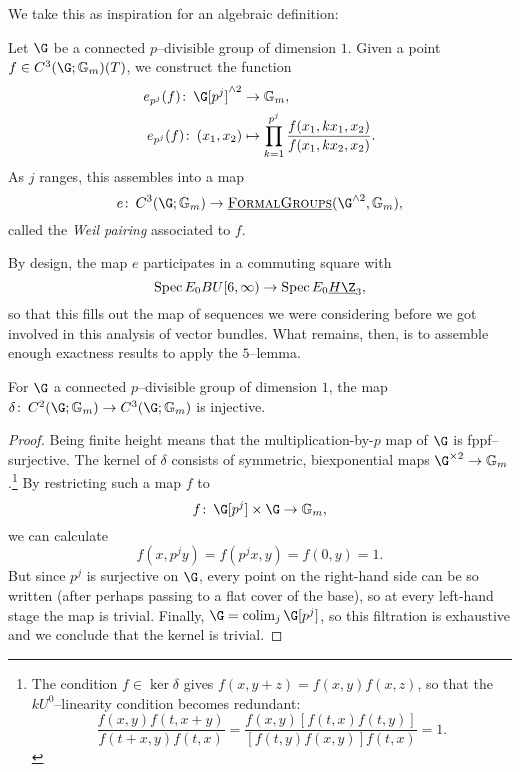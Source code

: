 We take this as inspiration for an algebraic definition:

\begin{definition}
Let \(\G\) be a connected \(p\)--divisible group of dimension \(1\).  Given a point \(f \in C^3(\G; \Gm)(T)\), we construct the function
\begin{align*}
e_{p^j}(f)\co \G[p^j]^{\sm 2} & \to \Gm, \\
e_{p^j}(f)\co (x_1, x_2) & \mapsto \prod_{k=1}^{p^j} \frac{f(x_1, kx_1, x_2)}{f(x_1, kx_2, x_2)}.
\end{align*}
As \(j\) ranges, this assembles into a map \[e\co C^3(\G; \Gm) \to \InternalHom{FormalGroups}(\G^{\sm 2}, \Gm),\] called the \textit{Weil pairing} associated to \(f\).
\end{definition}

By design, the map \(e\) participates in a commuting square with \[\Spec E_0 BU[6, \infty) \to \Spec E_0 \OS{H\Z}{3},\] so that this fills out the map of sequences we were considering before we got involved in this analysis of vector bundles.  What remains, then, is to assemble enough exactness results to apply the \(5\)--lemma.

\begin{lemma}
For \(\G\) a connected \(p\)--divisible group of dimension \(1\), the map \(\delta\co C^2(\G; \Gm) \to C^3(\G; \Gm)\) is injective.
\end{lemma}
\begin{proof}
Being finite height means that the multiplication-by-\(p\) map of \(\G\) is fppf--surjective.  The kernel of \(\delta\) consists of symmetric, biexponential maps \(\G^{\times 2} \to \Gm\).\footnote{The condition \(f \in \ker \delta\) gives \(f(x, y+z) = f(x, y)f(x, z)\), so that the \(kU^0\)--linearity condition becomes redundant: \[\frac{f(x, y) f(t, x+y)}{f(t+x, y) f(t, x)} = \frac{f(x, y) [f(t, x) f(t, y)]}{[f(t, y) f(x, y)] f(t, x)} = 1.\]}  By restricting such a map \(f\) to \[f \co \G[p^j] \times \G \to \Gm,\] we can calculate \[f(x, p^j y) = f(p^j x, y) = f(0, y) = 1.\]  But since \(p^j\) is surjective on \(\G\), every point on the right-hand side can be so written (after perhaps passing to a flat cover of the base), so at every left-hand stage the map is trivial.  Finally, \(\G = \colim_j \G[p^j]\), so this filtration is exhaustive and we conclude that the kernel is trivial.
\end{proof}

